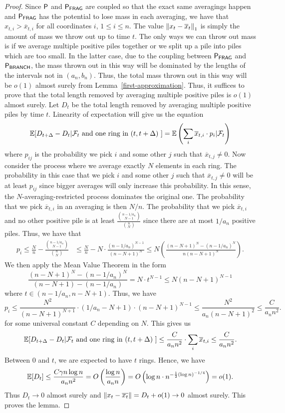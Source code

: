 \documentclass[12pt]{article}
\begin{document}
\begin{proof}
	Since $\mathsf{P}$ and $\mathsf{P}_{\mathsf{FRAG}}$ are coupled so that the exact same averagings happen and $\mathsf{P}_{\mathsf{FRAG}}$ has the potential to lose mass in each averaging, we have that $x_{t, i} > \overline{x}_{t, i}$ for all coordinates $i$, $1 \leq i \leq n$. The value $\left\lVert x_t - \overline{x}_t \right\rVert_1$ is simply the amount of mass we throw out up to time $t$. The only ways we can throw out mass is if we average multiple positive piles together or we split up a pile into piles which are too small. In the latter case, due to the coupling between $\mathsf{P}_{\mathsf{FRAG}}$ and $\mathsf{P}_{\mathsf{BRANCH}}$, the mass thrown out in this way will be dominated by the lengths of the intervals not in $(a_n, b_n)$. Thus, the total mass thrown out in this way will be $o(1)$ almost surely from Lemma~\ref{first-approximation}. Thus, it suffices to prove that the total length removed by averaging multiple positive piles is $o(1)$ almost surely. Let $D_t$ be the total length removed by averaging multiple positive piles by time $t$. Linearity of expectation will give us the equation
	\[
		\mathbb{E} [ D_{t + \Delta} - D_t | \mathcal{F}_t \text{ and one ring in $(t, t + \Delta)$ } ] = \mathbb{E} \left ( \sum_i \overline{x}_{t, i} \cdot p_{i} | \mathcal{F}_t \right )
	\]
	where $p_{ij}$ is the probability we pick $i$ and some other $j$ such that $\overline{x}_{t, j} \neq 0$. Now consider the process where we average exactly $N$ elements in each ring. The probability in this case that we pick $i$ and some other $j$ such that $\overline{x}_{t, j} \neq 0$ will be at least $p_{ij}$ since bigger averages will only increase this probability. In this sense, the $N$-averaging-restricted process dominates the original one. The probability that we pick $\overline{x}_{t, i}$ in an averaging is then $N / n$. The probability that we pick $\overline{x}_{t, i}$ and no other positive pile is at least $\frac{\binom{n - 1/a_n}{N-1}}{\binom{n}{N}}$ since there are at most $1/a_n$ positive piles. Thus, we have that
	\begin{align*}
		p_i \leq \frac{N}{n} - \frac{\binom{n-1/a_n}{N-1}}{\binom{n}{N}} & \leq \frac{N}{n} - N \cdot \frac{(n-1/a_n)^{N-1}}{(n-N+1)^N} \leq N \left ( \frac{(n-N+1)^N - (n-1/a_n)^N}{n(n-N+1)^N} \right ). 
	\end{align*}
	We then apply the Mean Value Theorem in the form
	\[
		\frac{(n-N+1)^N - (n-1/a_n)^N}{(n-N+1) - (n-1/a_n)} = N \cdot t^{N-1} \leq N (n-N+1)^{N-1}
	\]
	where $t \in (n-1/a_n, n-N+1)$. Thus, we have
	\[
		p_i \leq \frac{N^2}{(n-N+1)^{N+1}} \cdot (1/a_n - N + 1) \cdot (n-N+1)^{N-1} \leq \frac{N^2}{a_n (n-N+1)^2} \leq \frac{C}{a_n n^2}.
	\]
	for some universal constant $C$ depending on $N$. This gives us 
	\[
		\mathbb{E} [ D_{t + \Delta} - D_t | \mathcal{F}_t \text{ and one ring in $(t, t + \Delta)$ } ] \leq \frac{C}{a_n n^2} \cdot \sum_i \overline{x}_{t, i} \leq \frac{C}{a_n n^2}.
	\]
	Between $0$ and $t$, we are expected to have $t$ rings. Hence, we have 
	\[
		\mathbb{E} [D_t] \leq \frac{C \gamma n \log n}{a_n n^2} = O \left ( \frac{\log n}{a_n n} \right ) = O \left ( \log n \cdot n^{- \frac{1}{2}(\log n)^{-1/4}} \right ) = o(1). 
	\]
	Thus $D_t \to 0$ almost surely and $\left\lVert x_t - \overline{x_t} \right\rVert = D_t + o(1) \to 0$ almost surely. This proves the lemma. 
\end{proof}
\end{document}
